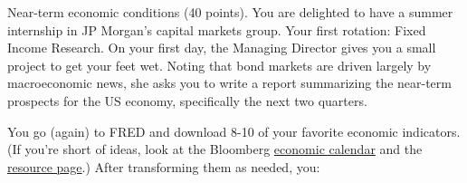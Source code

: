 \documentclass[12pt]{exam}
\begin{document}
\begin{questions}
\begin{solution}
\end{solution}

\question Near-term economic conditions (40 points).
You are delighted to have a summer internship in JP Morgan's
capital markets group.
Your first rotation:  Fixed Income Research.
On your first day, the Managing Director gives you
a small project to get your feet wet.
Noting that bond markets are driven largely by macroeconomic news,
she asks you to write a report summarizing the near-term prospects for the US
economy, specifically the next two quarters.

You go (again) to FRED
and download 8-10 of your favorite economic indicators.
(If you're short of ideas, look at the Bloomberg
\href{http://www.bloomberg.com/markets/economic-calendar/}{economic calendar}
and the
\href{http://pages.stern.nyu.edu/~dbackus/macro_resources.htm}{resource page}.)
After transforming them as needed,
you:
%
\begin{parts}

\end{parts}
\end{questions}
\end{document}
